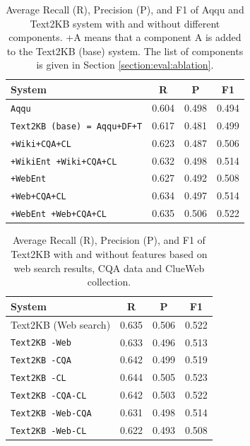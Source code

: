 \begin{table}[h]
\begin{tabular}{| p{4.5cm} | c | c | c | }
\hline
System & R & P & F1 \\
\hline
\texttt{Aqqu} & 0.604 & 0.498 & 0.494\\
\texttt{Text2KB (base) = Aqqu+DF+T} & 0.617 & 0.481 & 0.499 \\
\hline
\texttt{+Wiki+CQA+CL} & 0.623 & 0.487 & 0.506 \\
\texttt{+WikiEnt +Wiki+CQA+CL} & 0.632 & 0.498 & 0.514 \\
\hline
\texttt{+WebEnt} & 0.627 & 0.492 & 0.508 \\
\texttt{+Web+CQA+CL} & 0.634 & 0.497 & 0.514 \\
\texttt{+WebEnt +Web+CQA+CL} & 0.635 & 0.506 & 0.522 \\
\hline
\end{tabular}
\vspace{-2mm}
\caption{Average Recall (R), Precision (P), and F1 of Aqqu and Text2KB system with and without different components. +A means that a component A is added to the Text2KB (base) system. The list of components is given in Section \ref{section:eval:ablation}.}
\label{table:ablation:entities_vs_features}
\end{table}

\begin{table}[h]
\centering
\begin{tabular}{| p{4cm} | c | c | c | }
\hline
System & R & P &  F1 \\
\hline
Text2KB (Web search) & 0.635 & 0.506 & 0.522 \\
\hline
\texttt{Text2KB -Web} & 0.633 & 0.496 & 0.513 \\
\texttt{Text2KB -CQA} & 0.642 & 0.499 & 0.519 \\
\texttt{Text2KB -CL} & 0.644 & 0.505 & 0.523 \\
\hline
\texttt{Text2KB -CQA-CL} & 0.642 & 0.503 & 0.522 \\
\texttt{Text2KB -Web-CQA} & 0.631 & 0.498 & 0.514 \\
\texttt{Text2KB -Web-CL} & 0.622 & 0.493 & 0.508 \\
\hline
\end{tabular}
\caption{Average Recall (R), Precision (P), and F1 of Text2KB with and without features based on web search results, CQA data and ClueWeb collection.}
\label{table:ablation:features}
\end{table}

